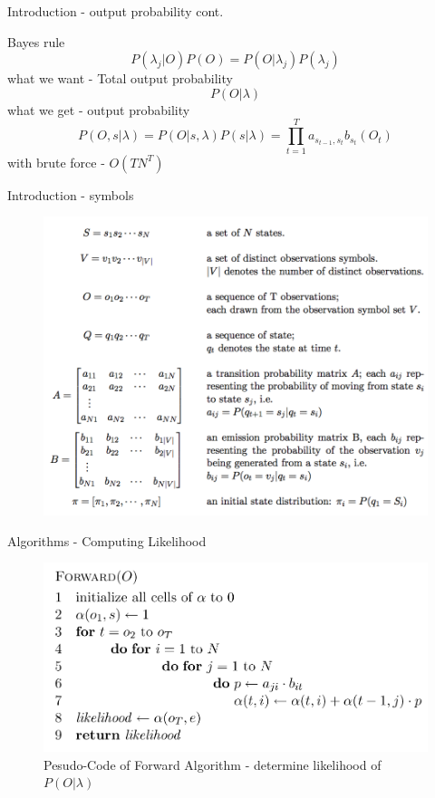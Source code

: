 \documentclass[11pt]{beamer}
\begin{document}
\begin{frame}{Introduction - output probability cont.}
	
	Bayes rule
	\begin{equation}
	P(\lambda_j | O)P(O) = P(O|\lambda_j)P(\lambda_j)
	\end{equation}
	what we want - Total output probability
	\begin{equation}
	P(O|\lambda)
	\end{equation}
	what we get - output probability  
	\begin{equation}
	P(O,s|\lambda) = P(O|s,\lambda)P(s|\lambda) = \prod_{t=1}^{T} a_{s_{t-1},s_t}b_{s_t}(O_t)
	\end{equation}
	with brute force - $O(TN^T)$
\end{frame}

\begin{frame}{Introduction - symbols}
\begin{figure}
\includegraphics[scale=0.25]{"symbols"}
\end{figure}
\end{frame}

\begin{frame}{Algorithms - Computing Likelihood}
\begin{figure}[H]

\centering
\includegraphics[scale=0.35]{"FW"}
\caption{Pesudo-Code of Forward Algorithm -
	determine likelihood of $P(O|\lambda)$ \cite{cuhmm} }
\end{figure}
\end{frame}
\end{document}
